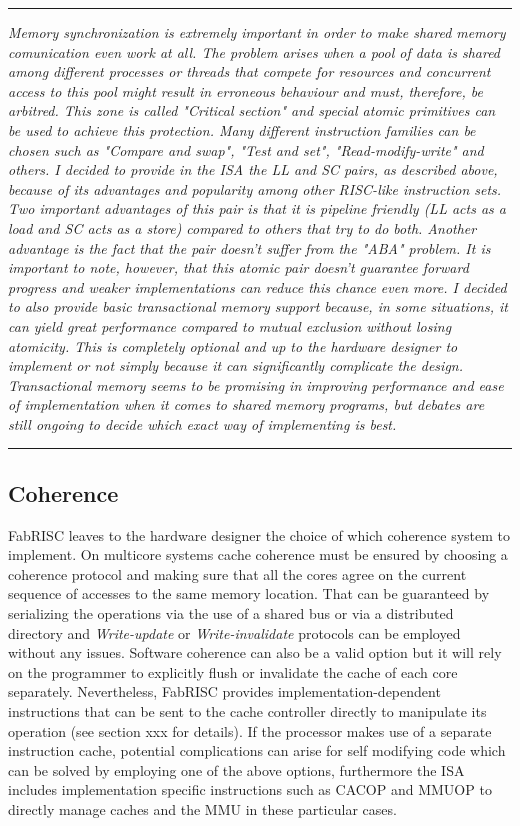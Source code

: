 \documentclass{article}
\begin{document}
        \par\noindent\rule{\textwidth}{0.4pt}
        \textit{Memory synchronization is extremely important in order to make shared memory comunication even work at all. The problem arises when a pool of data is shared among different processes or threads that compete for resources and concurrent access to this pool might result in erroneous behaviour and must, therefore, be arbitred. This zone is called "Critical section" and special atomic primitives can be used to achieve this protection. Many different instruction families can be chosen such as "Compare and swap", "Test and set", "Read-modify-write" and others. I decided to provide in the ISA the LL and SC pairs, as described above, because of its advantages and popularity among other RISC-like instruction sets. Two important advantages of this pair is that it is pipeline friendly (LL acts as a load and SC acts as a store) compared to others that try to do both. Another advantage is the fact that the pair doesn't suffer from the "ABA" problem. It is important to note, however, that this atomic pair doesn't guarantee forward progress and weaker implementations can reduce this chance even more. I decided to also provide basic transactional memory support because, in some situations, it can yield great performance compared to mutual exclusion without losing atomicity. This is completely optional and up to the hardware designer to implement or not simply because it can significantly complicate the design. Transactional memory seems to be promising in improving performance and ease of implementation when it comes to shared memory programs, but debates are still ongoing to decide which exact way of implementing is best.}
        \par\noindent\rule{\textwidth}{0.4pt}

        \subsection{Coherence}

            FabRISC leaves to the hardware designer the choice of which coherence system to implement. On multicore systems cache coherence must be ensured by choosing a coherence protocol and making sure that all the cores agree on the current sequence of accesses to the same memory location. That can be guaranteed by serializing the operations via the use of a shared bus or via a distributed directory and \textit{Write-update} or \textit{Write-invalidate} protocols can be employed without any issues. Software coherence can also be a valid option but it will rely on the programmer to explicitly flush or invalidate the cache of each core separately. Nevertheless, FabRISC provides implementation-dependent instructions that can be sent to the cache controller directly to manipulate its operation (see section xxx for details). If the processor makes use of a separate instruction cache, potential complications can arise for self modifying code which can be solved by employing one of the above options, furthermore the ISA includes implementation specific instructions such as CACOP and MMUOP to directly manage caches and the MMU in these particular cases.
\end{document}
